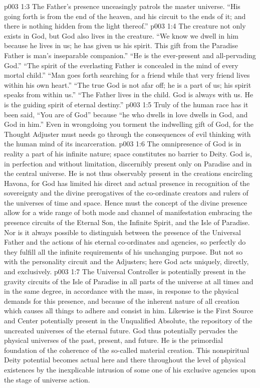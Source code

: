 \vs p003 1:3 The Father’s presence unceasingly patrols the master universe. “His going forth is from the end of the heaven, and his circuit to the ends of it; and there is nothing hidden from the light thereof.”
\pc \vs p003 1:4 The creature not only exists in God, but God also lives in the creature. “We know we dwell in him because he lives in us; he has given us his spirit. This gift from the Paradise Father is man’s inseparable companion.” “He is the ever\hyp{}present and all\hyp{}pervading God.” “The spirit of the everlasting Father is concealed in the mind of every mortal child.” “Man goes forth searching for a friend while that very friend lives within his own heart.” “The true God is not afar off; he is a part of us; his spirit speaks from within us.” “The Father lives in the child. God is always with us. He is the guiding spirit of eternal destiny.”
\vs p003 1:5 Truly of the human race has it been said, “You are of God” because “he who dwells in love dwells in God, and God in him.” Even in wrongdoing you torment the indwelling gift of God, for the Thought Adjuster must needs go through the consequences of evil thinking with the human mind of its incarceration.
\pc \vs p003 1:6 The omnipresence of God is in reality a part of his infinite nature; space constitutes no barrier to Deity. God is, in perfection and without limitation, discernibly present only on Paradise and in the central universe. He is not thus observably present in the creations encircling Havona, for God has limited his direct and actual presence in recognition of the sovereignty and the divine prerogatives of the co\hyp{}ordinate creators and rulers of the universes of time and space. Hence must the concept of the divine presence allow for a wide range of both mode and channel of manifestation embracing the presence circuits of the Eternal Son, the Infinite Spirit, and the Isle of Paradise. Nor is it always possible to distinguish between the presence of the Universal Father and the actions of his eternal co\hyp{}ordinates and agencies, so perfectly do they fulfill all the infinite requirements of his unchanging purpose. But not so with the personality circuit and the Adjusters; here God acts uniquely, directly, and exclusively.
\pc \vs p003 1:7 The Universal Controller is potentially present in the gravity circuits of the Isle of Paradise in all parts of the universe at all times and in the same degree, in accordance with the mass, in response to the physical demands for this presence, and because of the inherent nature of all creation which causes all things to adhere and consist in him. Likewise is the First Source and Center potentially present in the Unqualified Absolute, the repository of the uncreated universes of the eternal future. God thus potentially pervades the physical universes of the past, present, and future. He is the primordial foundation of the coherence of the so\hyp{}called material creation. This nonspiritual Deity potential becomes actual here and there throughout the level of physical existences by the inexplicable intrusion of some one of his exclusive agencies upon the stage of universe action.
